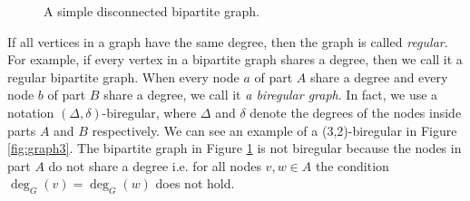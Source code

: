 \begin{figure}[H]
\centering
\caption{A simple disconnected bipartite graph.\label{fig:graph2}}
\end{figure}

If all vertices in a graph have the same degree, then the graph is called \emph{regular}.
For example, if every vertex in a bipartite graph shares a degree, then we call it a regular bipartite graph. When every node $a$ of part $A$ share a degree and every node $b$ of part $B$ share a degree, we call it \emph{a biregular graph}.
In fact, we use a notation $(\Delta, \delta)$-biregular, where $\Delta$ and $\delta$ denote the degrees of the nodes inside parts $A$ and $B$ respectively.
We can see an example of a (3,2)-biregular in Figure \ref{fig:graph3}.
The bipartite graph in Figure \ref{fig:graph2} is not biregular because the nodes in part $A$ do not share a degree i.e. for all nodes $v, w \in A$ the condition $\deg_G(v) = \deg_G(w)$ does not hold.

